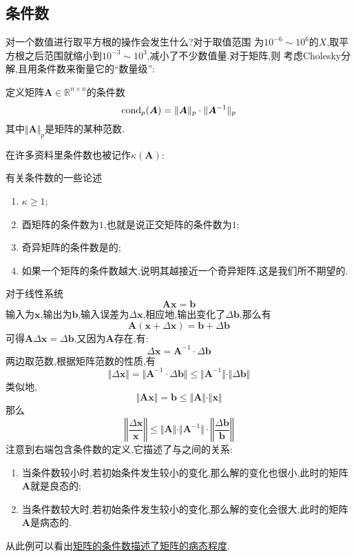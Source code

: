 \documentclass[cn,10pt,citestyle=gb7714-2015,bibstyle=gb7714-2015]{elegantbook}
\begin{document}
\subsection{条件数}
\textcolor{magenta}{\HandRight}对一个数值进行取平方根的操作会发生什么?对于取值范围
为$10^{-6}\sim 10^{6}$的$X$,取平方根之后范围就缩小到$10^{-3}\sim 10^3$,减小了不少数值量.对于矩阵,则
考虑Cholesky分解,且用条件数来衡量它的“数量级”:
\begin{definition}\label{def:condition-number}
  定义矩阵$\bm{A}\in\mathbb{R}^{n\times n}$的条件数
  \begin{equation}
    \textup{cond}_p(\bm{A})=\Vert\bm{A}\Vert_p\cdot\Vert\bm{A}^{-1}\Vert_p
  \end{equation}
  其中$\Vert\bm{A}\Vert_p$是矩阵的某种范数.
\end{definition}
在许多资料里条件数也被记作$\kappa(\bm{A})$:
\begin{conclusion}有关条件数的一些论述
  \begin{enumerate}
    \item $\kappa \geqslant 1$;
    \item 酉矩阵的条件数为$1$,也就是说正交矩阵的条件数为$1$;
    \item 奇异矩阵的条件数是的;
    \item 如果一个矩阵的条件数越大,说明其越接近一个奇异矩阵,这是我们所不期望的.
  \end{enumerate}
\end{conclusion}
\begin{example}
  对于线性系统
  \[
    \bm{A}\bm{x}=\bm{b}
  \]
  输入为$\bm{x}$,输出为$\bm{b}$,输入误差为$\Delta\bm{x}$,相应地,输出变化了$\Delta\bm{b}$,那么有
  \[
    \bm{A}(\bm{x}+\Delta\bm{x})=\bm{b}+\Delta\bm{b}
  \]
  可得$\bm{A}\Delta\bm{x}=\Delta\bm{b}$,又因为$\bm{A}$存在,有:
  \[
    \Delta\bm{x}=\bm{A}^{-1}\cdot\Delta\bm{b}
  \]
  两边取范数,根据矩阵范数的性质,有
  \[
    \Vert\Delta\bm{x}\Vert=\Vert\bm{A}^{-1}\cdot\Delta\bm{b}\Vert\leqslant\Vert\bm{A}^{-1}\Vert\cdot\Vert\Delta\bm{b}\Vert
  \]
  类似地,
  \[
    \Vert\bm{A}\bm{x}\Vert=\bm{b}\leqslant\Vert\bm{A}\Vert\cdot\Vert\bm{x}\Vert
  \]
  那么
  \[
    \left\Vert\frac{\Delta\bm{x}}{\bm{x}}\right\Vert\leqslant\Vert\bm{A}\Vert\cdot\Vert\bm{A}^{-1}\Vert\cdot\left\Vert\frac{\Delta\bm{b}}{\bm{b}}\right\Vert
  \]
  注意到右端包含条件数的定义,它描述了与之间的关系:
  \begin{enumerate}
    \item 当条件数较小时,若初始条件发生较小的变化,那么解的变化也很小,此时的矩阵$\bm{A}$就是良态的;
    \item 当条件数较大时,若初始条件发生较小的变化,那么解的变化会很大,此时的矩阵$\bm{A}$是病态的.
  \end{enumerate}
  从此例可以看出\uline{矩阵的条件数描述了矩阵的病态程度}.
\end{example}
\end{document}
